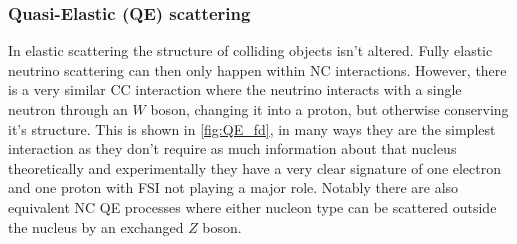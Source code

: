 \documentclass[a4paper,12pt]{article}
\begin{document}
\subsubsection{Quasi-Elastic (QE) scattering}
In elastic scattering the structure of colliding objects isn't altered.
Fully elastic neutrino scattering can then only happen within NC interactions.
However, there is a very similar CC interaction where the neutrino interacts with a single neutron through an $W$ boson, changing it into a proton, but otherwise conserving it's structure.
This is shown in \cref{fig:QE_fd}, in many ways they are the simplest interaction as they don't require as much information about that nucleus theoretically and experimentally they have a very clear signature of one electron and one proton with FSI not playing a major role.
Notably there are also equivalent NC QE processes where either nucleon type can be scattered outside the nucleus by an exchanged $Z$ boson.
\end{document}
